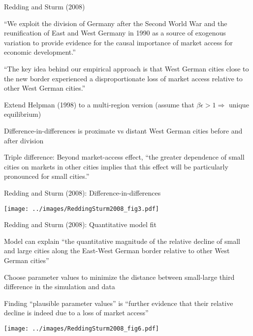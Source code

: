 \documentclass[11pt,notes=hide,aspectratio=169]{beamer}
\begin{document}
\begin{frame}{Redding and Sturm (2008)}
\begin{itemize}
{\small
	\item ``We exploit the division of Germany after the Second World War and the reunification of East and West Germany in 1990 as a source of exogenous variation to provide evidence for the causal importance of market access for economic development.''
	\item ``The key idea behind our empirical approach is that West German cities close to the new border experienced a disproportionate loss of market access relative to other West German cities.''
	\item Extend Helpman (1998) to a multi-region version (assume that $\beta\epsilon>1 \Rightarrow$ unique equilibrium)
	\item Difference-in-differences is proximate vs distant West German cities before and after division
	\item Triple difference: Beyond market-access effect, ``the greater dependence of small cities on markets in other cities implies that this effect will be particularly pronounced for small cities.''
}
\end{itemize}
\end{frame}
\begin{frame}{Redding and Sturm (2008): Difference-in-differences}
\begin{center}
\texttt{[image: ../images/ReddingSturm2008\_fig3.pdf]}
\end{center}
\end{frame}
\begin{frame}{Redding and Sturm (2008): Quantitative model fit}
\begin{itemize}
	{\small
	\item Model can explain ``the quantitative magnitude of the relative decline of small and large cities along the East-West German border relative to other West German cities''
	\item Choose parameter values to minimize the distance between small-large third difference in the simulation and data
	\item Finding ``plausible parameter values'' is ``further evidence that their relative decline is indeed due to a loss of market access''
	}
\end{itemize}
\begin{center}
\texttt{[image: ../images/ReddingSturm2008\_fig6.pdf]}
\end{center}
\end{frame}
\end{document}
